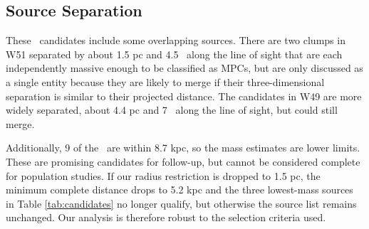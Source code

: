 \subsection{Source Separation}
These \ncandidates\ candidates include some overlapping sources.
There are two clumps in W51 separated by about 1.5 pc and 4.5 \kms\ along the
line of sight that are each independently massive enough to be classified as
MPCs, but are only discussed as a single entity because they are likely
to merge if their three-dimensional separation is similar to their projected
distance.  The candidates in W49 are more widely separated, about 4.4 pc and 7
\kms\ along the line of sight, but could still merge.

Additionally, 9 of the \ncandidates\ are within 8.7 kpc, so the mass
estimates are lower limits.  These are promising candidates for follow-up, but
cannot be considered complete for population studies.  If our radius restriction
is dropped to 1.5 pc, the minimum complete distance drops to 5.2 kpc and the
three lowest-mass sources in Table \ref{tab:candidates} no longer qualify, but
otherwise the source list remains unchanged.  Our analysis is therefore robust
to the selection criteria used.

% 

